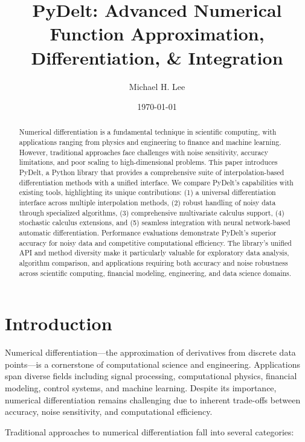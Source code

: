 \documentclass[11pt,a4paper]{article}
\title{PyDelt: Advanced Numerical Function Approximation, Differentiation, \& Integration}
\author{Michael H. Lee}
\date{\today}
\begin{document}
\maketitle

\begin{abstract}
Numerical differentiation is a fundamental technique in scientific computing, with applications ranging from physics and engineering to finance and machine learning. However, traditional approaches face challenges with noise sensitivity, accuracy limitations, and poor scaling to high-dimensional problems. This paper introduces PyDelt, a Python library that provides a comprehensive suite of interpolation-based differentiation methods with a unified interface. We compare PyDelt's capabilities with existing tools, highlighting its unique contributions: (1) a universal differentiation interface across multiple interpolation methods, (2) robust handling of noisy data through specialized algorithms, (3) comprehensive multivariate calculus support, (4) stochastic calculus extensions, and (5) seamless integration with neural network-based automatic differentiation. Performance evaluations demonstrate PyDelt's superior accuracy for noisy data and competitive computational efficiency. The library's unified API and method diversity make it particularly valuable for exploratory data analysis, algorithm comparison, and applications requiring both accuracy and noise robustness across scientific computing, financial modeling, engineering, and data science domains.
\end{abstract}

\tableofcontents

\section{Introduction}

Numerical differentiation—the approximation of derivatives from discrete data points—is a cornerstone of computational science and engineering. Applications span diverse fields including signal processing, computational physics, financial modeling, control systems, and machine learning. Despite its importance, numerical differentiation remains challenging due to inherent trade-offs between accuracy, noise sensitivity, and computational efficiency.

Traditional approaches to numerical differentiation fall into several categories:
\end{document}
